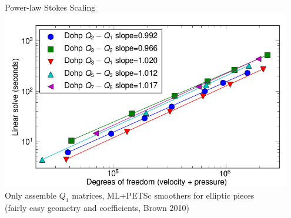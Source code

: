 \begin{frame}{Power-law Stokes Scaling}
  \centering
  \includegraphics[width=0.95\textwidth]{figures/Dohp/Stokes2} \\
  {\small Only assemble $Q_1$ matrices, ML+PETSc smoothers for elliptic pieces \\
  (fairly easy geometry and coefficients, Brown 2010)}
\end{frame}

